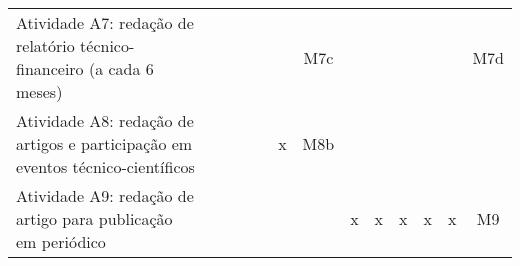 \begin{table}[h!]
\begin{tabular}{ p{} cccccccccccc}
   Atividade A7: redação de relatório técnico-financeiro (a cada 6 meses)          &    &    &    &    &    & M7c&    &    &    &    &    & M7d\\
   Atividade A8: redação de artigos e participação em eventos técnico-científicos &    &    &    &    & x  & M8b&    &    &    &    &    &    \\
   Atividade A9: redação de artigo para publicação em periódico                    &    &    &    &    &    &    & x  & x  & x  & x  & x  & M9 \\
\bottomrule
\end{tabular}
	\label{tab:crono}
\end{table}
\clearpage
